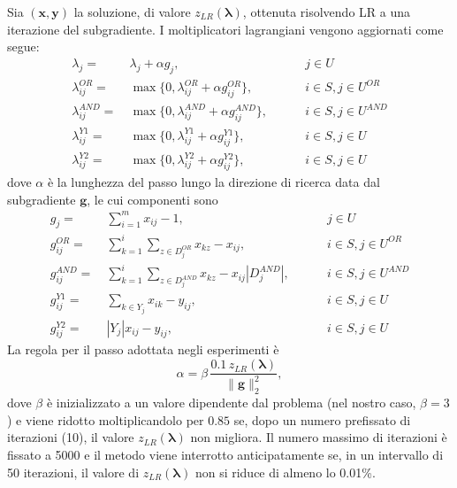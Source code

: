 \documentclass[12pt,a4paper,openright,twoside]{book}
\begin{document}
Sia $(\boldsymbol{x},\boldsymbol{y})$ la soluzione, di valore $z_{LR}(\boldsymbol{\lambda})$, ottenuta risolvendo LR a una iterazione del subgradiente. I moltiplicatori lagrangiani vengono aggiornati come segue:
\begin{equation}
\begin{aligned}
\lambda_j = &\ \lambda_j + \alpha g_j, &\ \qquad j \in U \\
\lambda^{OR}_{ij} = &\ \max \{0,\lambda^{OR}_{ij} + \alpha g^{OR}_{ij} \}, &\ \qquad i \in S, j \in U^{OR} \\
\lambda^{AND}_{ij} = &\ \max \{0,\lambda^{AND}_{ij} + \alpha g^{AND}_{ij} \}, &\ \qquad i \in S, j \in U^{AND} \\
\lambda^{Y1}_{ij} = &\ \max \{0,\lambda^{Y1}_{ij} + \alpha g^{Y1}_{ij} \}, &\ \qquad i \in S, j \in U \\
\lambda^{Y2}_{ij} = &\ \max \{0,\lambda^{Y2}_{ij} + \alpha g^{Y2}_{ij} \}, &\ \qquad i \in S, j \in U
\end{aligned}
\label{EqLD2}
\end{equation}
dove $\alpha$ è la lunghezza del passo lungo la direzione di ricerca data dal subgradiente $\boldsymbol{g}$, le cui componenti sono
\begin{equation}
\begin{aligned}
g_j = &\ \sum_{i=1}^{m} x_{ij} - 1, &\ \qquad j \in U \\
g^{OR}_{ij} = &\ \sum_{k=1}^{i} \sum_{z \in D_j^{OR}} x_{kz} - x_{ij}, &\ \qquad i \in S, j \in U^{OR} \\
g^{AND}_{ij} = &\ \sum_{k=1}^{i} \sum_{z \in D_j^{AND}} x_{kz} - x_{ij}|D_j^{AND}|, &\ \qquad i \in S, j \in U^{AND} \\
g^{Y1}_{ij} = &\ \sum_{k \in Y_j} x_{ik} - y_{ij}, &\ \qquad i \in S, j \in U \\
g^{Y2}_{ij} = &\ |Y_j| x_{ij} - y_{ij}, &\ \qquad i \in S, j \in U
\end{aligned}
\label{EqLD3}
\end{equation}
La regola per il passo adottata negli esperimenti è
\[
\alpha = \beta \,\frac{0.1\, z_{LR}(\boldsymbol{\lambda})}{\lVert \boldsymbol{g} \rVert^2_2},
\]
dove $\beta$ è inizializzato a un valore dipendente dal problema (nel nostro caso, $\beta=3$) e viene ridotto moltiplicandolo per $0.85$ se, dopo un numero prefissato di iterazioni (10), il valore $z_{LR}(\boldsymbol{\lambda})$ non migliora. Il numero massimo di iterazioni è fissato a 5000 e il metodo viene interrotto anticipatamente se, in un intervallo di 50 iterazioni, il valore di $z_{LR}(\boldsymbol{\lambda})$ non si riduce di almeno lo 0.01\%.
\end{document}
